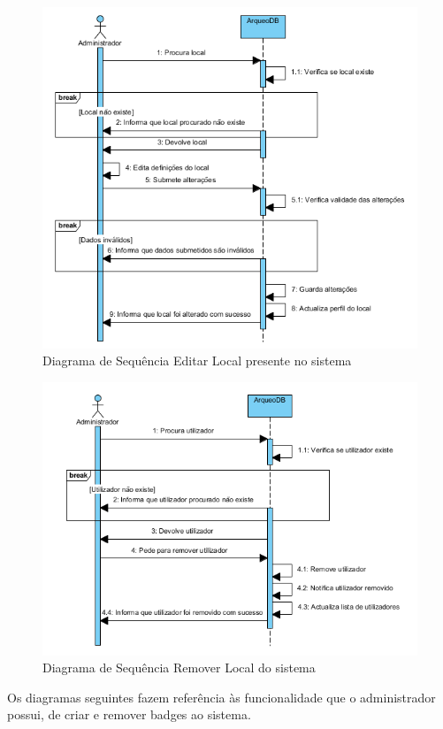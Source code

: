 ﻿\documentclass[12pt,a4paper]{article}
\begin{document}
\begin{figure}[h!]
\centering
\includegraphics[scale=1]{sequencia/A_editarlocal}
\caption{Diagrama de Sequência Editar Local presente no sistema} 
\end{figure}  

\begin{figure}[h!]
\centering
\includegraphics[scale=1]{sequencia/A_removerlocal}
\caption{Diagrama de Sequência Remover Local do sistema} 
\end{figure}

\clearpage
Os diagramas seguintes fazem referência às funcionalidade que o administrador possui, de criar e remover badges ao sistema.\\
\end{document}

